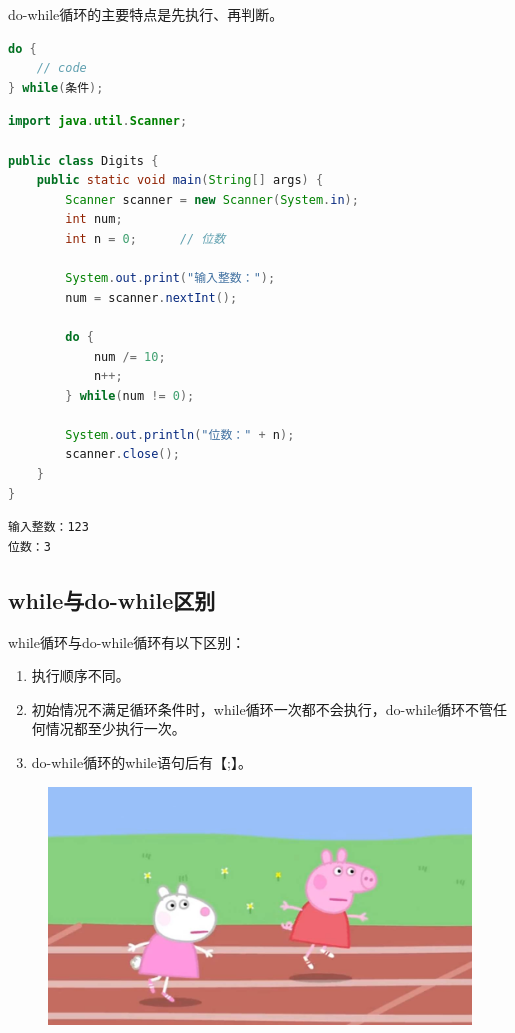 do-while循环的主要特点是先执行、再判断。

\vspace{-0.5cm}

\begin{lstlisting}[language=Java]
do {
    // code
} while(条件);
\end{lstlisting}

\vspace{0.5cm}


\begin{lstlisting}[language=Java]
import java.util.Scanner;

public class Digits {
    public static void main(String[] args) {
        Scanner scanner = new Scanner(System.in);
        int num;
        int n = 0;      // 位数
        
        System.out.print("输入整数：");
        num = scanner.nextInt();
        
        do {
            num /= 10;
            n++;
        } while(num != 0);
        
        System.out.println("位数：" + n);
        scanner.close();
    }
}
\end{lstlisting}

\begin{tcolorbox}
	\begin{verbatim}
输入整数：123
位数：3
    \end{verbatim}
\end{tcolorbox}

\subsection{while与do-while区别}

while循环与do-while循环有以下区别：

\begin{enumerate}
	\item 执行顺序不同。

	\item 初始情况不满足循环条件时，while循环一次都不会执行，do-while循环不管任何情况都至少执行一次。

	\item do-while循环的while语句后有【;】。
\end{enumerate}

\begin{figure}[H]
	\centering
	\includegraphics[scale=0.2]{img/C4/4-3/1.png}
\end{figure}

